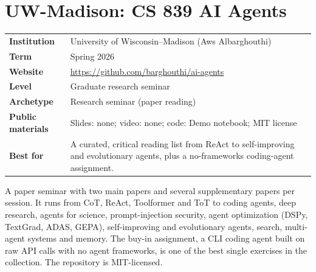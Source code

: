 \documentclass[10pt,oneside]{report}
\begin{document}
\chapter{UW-Madison: CS 839 AI Agents}\hypertarget{course-UW}{}
{\small\begin{tabularx}{\linewidth}{@{}>{\bfseries}l X@{}}\toprule
Institution & University of Wisconsin--Madison (Aws Albarghouthi)\\
Term & Spring 2026\\
Website & \href{https://github.com/barghouthi/ai-agents}{https://github.com/barghouthi/ai-agents}\\
Level & Graduate research seminar\\
Archetype & Research seminar (paper reading)\\
Public materials & Slides: none; video: none; code: Demo notebook; MIT license\\
Best for & A curated, critical reading list from ReAct to self-improving and evolutionary agents, plus a no-frameworks coding-agent assignment.\\
\bottomrule\end{tabularx}}

A paper seminar with two main papers and several supplementary papers per session.
It runs from CoT, ReAct, Toolformer and ToT to coding agents, deep research, agents for science, prompt-injection security, agent optimization (DSPy, TextGrad, ADAS, GEPA), self-improving and evolutionary agents, search, multi-agent systems and memory.
The buy-in assignment, a CLI coding agent built on raw API calls with no agent frameworks, is one of the best single exercises in the collection.
The repository is MIT-licensed.
\end{document}
